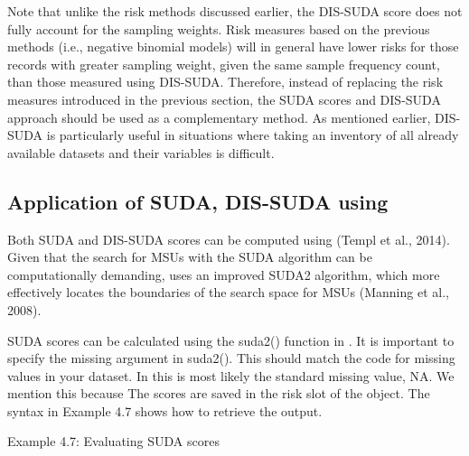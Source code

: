 \documentclass[letterpaper,10pt,english]{sphinxmanual}
\begin{document}
Note that unlike the risk methods discussed earlier, the DIS-SUDA score
does not fully account for the sampling weights. Risk measures based on
the previous methods (i.e., negative binomial models) will in general
have lower risks for those records with greater sampling weight, given
the same sample frequency count, than those measured using DIS-SUDA.
Therefore, instead of replacing the risk measures introduced in the
previous section, the SUDA scores and DIS-SUDA approach should be used
as a complementary method. As mentioned earlier, DIS-SUDA is
particularly useful in situations where taking an inventory of all
already available datasets and their variables is difficult.


\subsection{Application of SUDA, DIS-SUDA using }
\label{\detokenize{measure_risk:application-of-suda-dis-suda-using-sdcmicro}}
Both SUDA and DIS-SUDA scores can be computed using  (Templ et
al., 2014). Given that the search for MSUs with the SUDA algorithm can
be computationally demanding,  uses an improved SUDA2
algorithm, which more effectively locates the boundaries of the search
space for MSUs (Manning et al., 2008).

SUDA scores can be calculated using the suda2() function in .
It is important to specify the missing argument in suda2(). This should
match the code for missing values in your dataset. In  this is most
likely the  standard missing value, NA. We mention this because  The scores are saved in the risk slot of the 
object. The syntax in Example 4.7 shows how to retrieve the output.

Example 4.7: Evaluating SUDA scores
\end{document}
